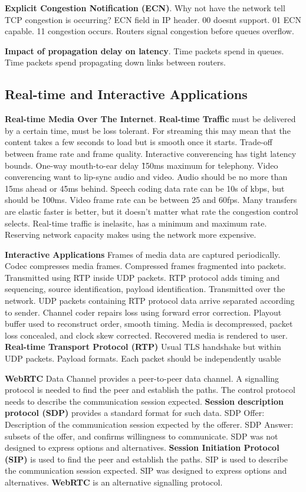 \documentclass{article}
\begin{document}
\textbf{Explicit Congestion Notification (ECN)}.
Why not have the network tell TCP congestion is occurring? ECN field in IP header.
00 doesnt support.
01 ECN capable.
11 congestion occurs.
Routers signal congestion before queues overflow.

\textbf{Impact of propagation delay on latency}.
Time packets spend in queues.
Time packets spend propagating down links between routers.


\subsection*{Real-time and Interactive Applications}

\textbf{Real-time Media Over The Internet}.
\textbf{Real-time Traffic} must be delivered by a certain time, must be loss tolerant.
For streaming this may mean that the content takes a few seconds to load but is smooth once it starts.
Trade-off between frame rate and frame quality.
Interactive converencing has tight latency bounds.
One-way mouth-to-ear delay \~150ms maximum for telephony.
Video converencing want to lip-sync audio and video.
Audio should be no more than 15ms ahead or 45ms behind.
Speech coding data rate can be 10s of kbps, but should be \~100ms.
Video frame rate can be between 25 and 60fps.
Many transfers are elastic \- faster is better, but it doesn't matter what rate the congestion control selects.
Real-time traffic is inelasitc, has a minimum and maximum rate.
Reserving network capacity makes using the network more expensive.

\textbf{Interactive Applications}
Frames of media data are captured periodically.
Codec compresses media frames.
Compressed frames fragmented into packets.
Transmitted using RTP inside UDP packets.
RTP protocol adds timing and sequencing, source identification, payload identification.
Transmitted over the network.
UDP packets containing RTP protocol data arrive separated according to sender.
Channel coder repairs loss using forward error correction.
Playout buffer used to reconstruct order, smooth timing.
Media is decompressed, packet loss concealed, and clock skew corrected.
Recovered media is rendered to user.
\textbf{Real-time Transport Protocol (RTP)}
Usual TLS handshake but within UDP packets.
Payload formats.
Each packet should be independently usable

\textbf{WebRTC} Data Channel provides a peer-to-peer data channel.
A signalling protocol is needed to find the peer and establish the paths.
The control protocol needs to describe the communication session expected.
\textbf{Session description protocol (SDP)} provides a standard format for such data.
SDP Offer: Description of the communication session expected by the offerer.
SDP Answer: subsets of the offer, and confirms willingness to communicate.
SDP was not designed to express options and alternatives.
\textbf{Session Initiation Protocol (SIP)} is used to find the peer and establish the paths.
SIP is used to describe the communication session expected.
SIP was designed to express options and alternatives.
\textbf{WebRTC} is an alternative signalling protocol.
\end{document}

